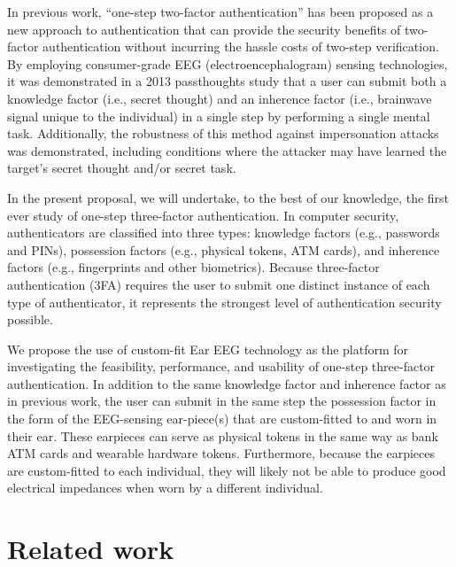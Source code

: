 \documentclass[letterpaper,twocolumn,10pt]{article}
\begin{document}
In previous work, “one-step two-factor authentication” has been proposed as a
new approach to authentication that can provide the security benefits of two-
factor authentication without incurring the hassle costs of two-step verification.
By employing consumer-grade EEG (electroencephalogram) sensing
technologies, it was demonstrated in a 2013 passthoughts study that a user can
submit both a knowledge factor (i.e., secret thought) and an inherence factor
(i.e., brainwave signal unique to the individual) in a single step by performing a
single mental task. Additionally, the robustness of this method against
impersonation attacks was demonstrated, including conditions where the attacker
may have learned the target’s secret thought and/or secret task.

In the present proposal, we will undertake, to the best of our knowledge, the first
ever study of one-step three-factor authentication. In computer security,
authenticators are classified into three types: knowledge factors (e.g., passwords
and PINs), possession factors (e.g., physical tokens, ATM cards), and inherence
factors (e.g., fingerprints and other biometrics). Because three-factor
authentication (3FA) requires the user to submit one distinct instance of each
type of authenticator, it represents the strongest level of authentication security
possible.

We propose the use of custom-fit Ear EEG technology as the platform for
investigating the feasibility, performance, and usability of one-step three-factor
authentication. In addition to the same knowledge factor and inherence factor as
in previous work, the user can submit in the same step the possession factor
in the form of the EEG-sensing ear-piece(s) that are custom-fitted to and worn in
their ear. These earpieces can serve as physical tokens in the same way as bank
ATM cards and wearable hardware tokens. Furthermore, because the earpieces
are custom-fitted to each individual, they will likely not be able to produce good
electrical impedances when worn by a different individual.

\section{Related work}
\label{sec:org3732d7c}
\end{document}
